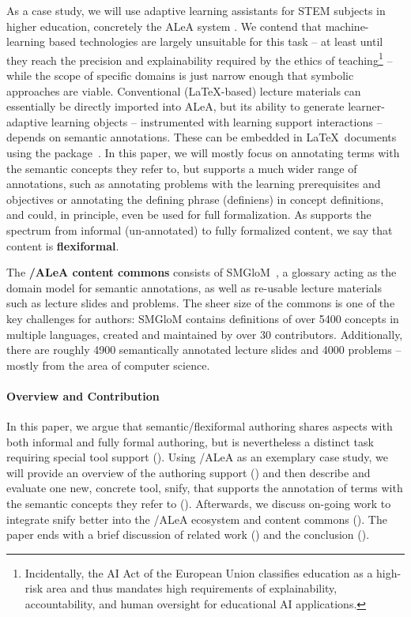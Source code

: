\documentclass[runningheads]{llncs}
\newcommand\ALeA{\textsf{ALeA}\xspace}
\newcommand\SMGloM{\textsf{SMGloM}\xspace}
\newcommand\snify{\textsf{snify}\xspace}
\begin{document}
As a case study, we will use adaptive learning assistants for STEM subjects in higher
education, concretely the \ALeA system \cite{BerBetChu:lssmkm23}.  We contend that
machine-learning based technologies are largely unsuitable for this task -- at least until
they reach the precision and explainability required by the ethics of
teaching\footnote{Incidentally, the AI Act of the European Union \cite{EUAIAct:on}
    classifies education as a high-risk area and thus mandates high requirements of
    explainability, accountability, and human oversight for educational AI applications.}
-- while the scope of specific domains is just narrow enough that symbolic approaches are
viable.  Conventional (\LaTeX-based) lecture materials can essentially be directly
imported into \ALeA, but its ability to generate learner-adaptive learning objects --
instrumented with learning support interactions -- depends on semantic annotations.  These
can be embedded in \LaTeX\ documents using the \sTeX
package~\cite{MueKo:sdstex22,sTeX:github:on}.  In this paper, we will mostly focus on
annotating terms with the semantic concepts they refer to, but \sTeX supports a much wider
range of annotations, such as annotating problems with the learning prerequisites
and objectives or annotating the defining phrase (definiens) in concept definitions,
and could, in principle, even be used for full formalization.  As \sTeX supports the
spectrum from informal (un-annotated) to fully formalized content, we say that \sTeX
content is \textbf{flexiformal}.

The \textbf{\sTeX/\ALeA content commons} consists of \SMGloM~\cite{GinIanJuc:spsttom16},
a glossary acting as the domain model for semantic annotations,
as well as re-usable lecture materials such as lecture slides and problems.
The sheer size
of the commons is one of the key challenges for authors: \SMGloM contains definitions of over
5400 concepts in multiple languages, created and maintained by over 30
contributors.  Additionally, there are roughly 4900
semantically annotated lecture slides and 4000 problems
-- mostly from the area of computer science.


\paragraph{Overview and Contribution}
In this paper, we argue that semantic/flexiformal authoring shares aspects with both informal and fully formal authoring,
but is nevertheless a distinct task requiring special tool support ().
Using \sTeX/\ALeA as an exemplary case study,
we will provide an overview of the authoring support ()
and then describe and evaluate one new, concrete tool, \snify, that supports the annotation
of terms with the semantic concepts they refer to ().
Afterwards, we discuss on-going work to integrate \snify better
into the \sTeX/\ALeA ecosystem and content commons ().
The paper ends with a brief discussion of related work () and the conclusion ().
\end{document}

